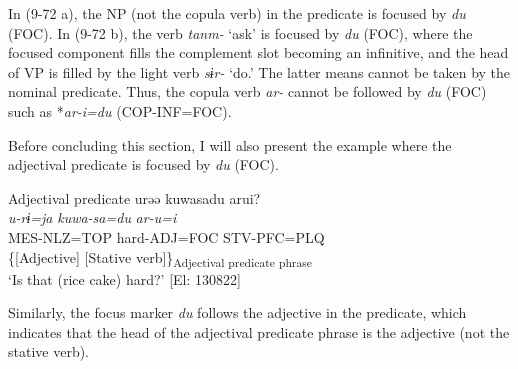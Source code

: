 In (9-72 a), the NP (not the copula verb) in the predicate is focused by \textit{du} (FOC). In (9-72 b), the verb \textit{tanm-} ‘ask’ is focused by \textit{du} (FOC), where the focused component fills the complement slot becoming an infinitive, and the head of VP is filled by the light verb \textit{sɨr-} ‘do.’ The latter means cannot be taken by the nominal predicate. Thus, the copula verb \textit{ar-} cannot be followed by \textit{du} (FOC) such as *\textit{ar-i=du} (COP-INF=FOC).

Before concluding this section, I will also present the example where the adjectival predicate is focused by \textit{du} (FOC).

\ea   Adjectival predicate \label{ex:9.73}
 \gllll  urəə  kuwasadu  arui?\\
    \textit{u-rɨ=ja}  \textit{kuwa-sa=du}  \textit{ar-u=i}\\
    MES-NLZ=TOP  hard-ADJ=FOC  STV-PFC=PLQ\\
      \{[Adjective]  [Stative verb]\}\textsubscript{Adjectival predicate phrase}\\
    \glt     ‘Is that (rice cake) hard?’ [El: 130822]
\z

Similarly, the focus marker \textit{du} follows the adjective in the predicate, which indicates that the head of the adjectival predicate phrase is the adjective (not the stative verb).
